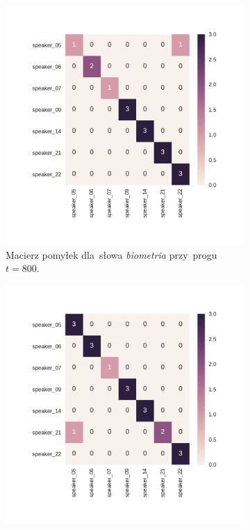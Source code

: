 \documentclass[11pt,a4paper]{article}
\begin{document}
\begin{figure}
    \centering
    \begin{subfigure}[t]{0.45\textwidth}
        \includegraphics[width=\textwidth]{res/plots/confusion_matrix_biometria.pdf}
        \caption{Macierz pomyłek dla~słowa \emph{biometria} przy~progu~$t = 800$.}
    \end{subfigure}
    \qquad
    \begin{subfigure}[t]{0.45\textwidth}
        \includegraphics[width=\textwidth]{res/plots/confusion_matrix_chrzaszcz.pdf}

\end{subfigure}
\end{figure}
\end{document}
